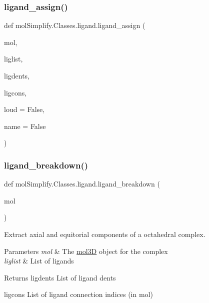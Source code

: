 \subsubsection{\texorpdfstring{ligand\+\_\+assign()}{ligand\_assign()}}
{\footnotesize\ttfamily def mol\+Simplify.\+Classes.\+ligand.\+ligand\+\_\+assign (\begin{DoxyParamCaption}\item[{}]{mol,  }\item[{}]{liglist,  }\item[{}]{ligdents,  }\item[{}]{ligcons,  }\item[{}]{loud = {\ttfamily False},  }\item[{}]{name = {\ttfamily False} }\end{DoxyParamCaption})}

\mbox{\label{namespacemolSimplify_1_1Classes_1_1ligand_a12137cc10c21aa301cdbb3b8fea4587b}} 
\subsubsection{\texorpdfstring{ligand\+\_\+breakdown()}{ligand\_breakdown()}}
{\footnotesize\ttfamily def mol\+Simplify.\+Classes.\+ligand.\+ligand\+\_\+breakdown (\begin{DoxyParamCaption}\item[{}]{mol }\end{DoxyParamCaption})}



Extract axial and equitorial components of a octahedral complex. 


\begin{DoxyParams}{Parameters}
{\em mol} & The \hyperlink{namespacemolSimplify_1_1Classes_1_1mol3D}{mol3D} object for the complex \\
\hline
{\em liglist} & List of ligands \\
\hline
\end{DoxyParams}
\begin{DoxyReturn}{Returns}
ligdents List of ligand dents 

ligcons List of ligand connection indices (in mol) 
\end{DoxyReturn}
